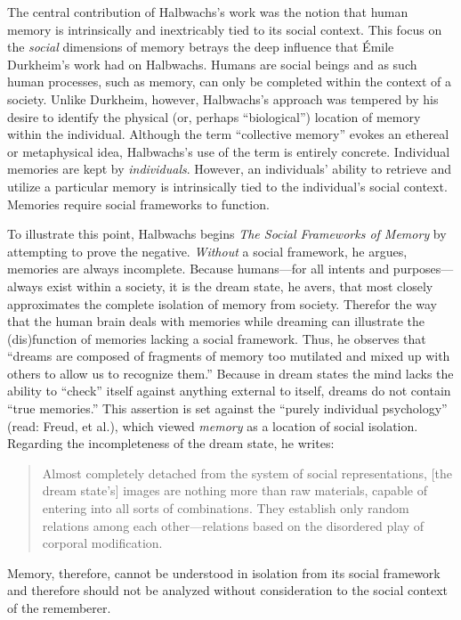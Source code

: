 The central contribution of Halbwachs's work was the notion that human
memory is intrinsically and inextricably tied to its social context.
This focus on the \emph{social} dimensions of memory betrays the deep
influence that Émile Durkheim's work had on Halbwachs. Humans are social
beings and as such human processes, such as memory, can only be
completed within the context of a society. Unlike Durkheim, however,
Halbwachs's approach was tempered by his desire to identify the physical
(or, perhaps ``biological'') location of memory within the individual.
Although the term ``collective memory'' evokes an ethereal or
metaphysical idea, Halbwachs's use of the term is entirely concrete.
Individual memories are kept by \emph{individuals}. However, an
individuals' ability to retrieve and utilize a particular memory is
intrinsically tied to the individual's social context. Memories require
social frameworks to function.\autocite[38]{halbwachs1992}

To illustrate this point, Halbwachs begins \emph{The Social Frameworks
of Memory} by attempting to prove the negative. \emph{Without} a social
framework, he argues, memories are always incomplete. Because
humans---for all intents and purposes---always exist within a society,
it is the dream state, he avers, that most closely approximates the
complete isolation of memory from society. Therefor the way that the
human brain deals with memories while dreaming can illustrate the
(dis)function of memories lacking a social framework. Thus, he observes
that ``dreams are composed of fragments of memory too mutilated and
mixed up with others to allow us to recognize them.'' Because in dream
states the mind lacks the ability to ``check'' itself against anything
external to itself, dreams do not contain ``true
memories.''\autocite[41]{halbwachs1992} This assertion is set against
the ``purely individual psychology'' (read: Freud, et al.), which viewed
\emph{memory} as a location of social isolation. Regarding the
incompleteness of the dream state, he writes:

\begin{quote}
Almost completely detached from the system of social representations,
{[}the dream state's{]} images are nothing more than raw materials,
capable of entering into all sorts of combinations. They establish only
random relations among each other---relations based on the disordered
play of corporal modification.\autocite[42]{halbwachs1992}
\end{quote}

Memory, therefore, cannot be understood in isolation from its social
framework and therefore should not be analyzed without consideration to
the social context of the rememberer.

